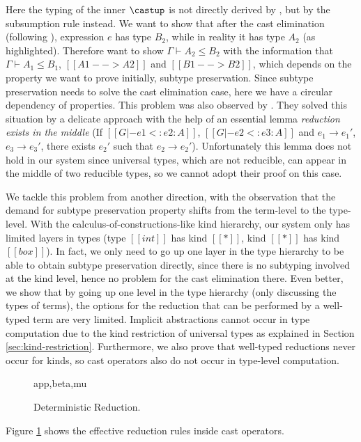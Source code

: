 Here the typing of the inner $\castup$ is not directly derived by
, but by the subsumption rule instead. We want to show that after
the cast elimination (following ), expression $e$ has type $B_2$,
while in reality it has type $A_2$ (as highlighted).
Therefore want to show $\Gamma \vdash A_2 \le B_2$ with the information that
$\Gamma \vdash A_1 \le B_1$, $[[A1 --> A2]]$
and $[[B1 --> B2]]$, which depends on the property we want to prove initially,
subtype preservation.
Since subtype preservation needs to solve the cast elimination case, here we have a
circular dependency of properties.
This problem was also observed by \cite{full}. They solved this situation
by a delicate approach with the help of an essential lemma
\emph{reduction exists in the middle} (If $[[G |- e1 <: e2 : A]]$, $[[G |- e2 <: e3 : A]]$
and $e_1 \longrightarrow e_1'$, $e_3 \longrightarrow e_3'$, there exists $e_2'$
such that $e_2 \longrightarrow e_2'$). Unfortunately this lemma does not hold
in our system since universal types, which are not reducible, can appear in the
middle of two reducible types, so we cannot adopt their proof on this case.

We tackle this problem from another direction, with the observation that the
demand for subtype preservation property shifts from the term-level to the type-level.
With the calculus-of-constructions-like kind hierarchy, our system only has
limited layers in types (type $[[int]]$ has kind $[[*]]$, kind $[[*]]$ has kind $[[box]]$).
In fact, we only need to go up one layer in the type hierarchy to be able to
obtain subtype preservation directly,
since there is no subtyping involved at the kind level,
hence no problem for the cast elimination there.
Even better, we show that by going up one level in the type hierarchy
(only discussing the types of terms), the options
for the reduction that can be performed by a well-typed term are very limited.
Implicit abstractions cannot occur in type computation due to the kind
restriction of universal types as explained in Section \ref{sec:kind-restriction}.
Furthermore, we also prove that well-typed reductions never occur
for kinds, so cast operators also do not occur in type-level computation.

\begin{figure}
      {app,beta,mu}
    \caption{Deterministic Reduction.}
    \label{fig:deterministic-reduction}
\end{figure}

Figure \ref{fig:deterministic-reduction} shows the effective reduction rules
inside cast operators.

